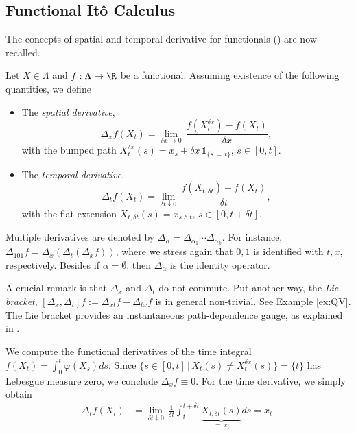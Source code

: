 \subsection{Functional Itô Calculus}
  The concepts of spatial and temporal derivative for functionals (\citet{Dupire}) are now recalled. 

\begin{definition}
Let $X \in \Lambda$ and $f:\Lambda \to \R$ be a functional. Assuming existence of the following quantities, we define
\begin{itemize}
    \item The \textit{spatial derivative},
    $$\Delta_x f(X_t) = \lim_{\delta x\to 0} \, \frac{f(X^{\delta x}_t)-f(X_t)}{\delta x}, $$
    with the bumped path $X^{\delta x}_t(s) =  x_s + \delta x\,\mathds{1}_{\{s\,=\,t\}}$, $s\in [0,t]$.
     \item The \textit{temporal derivative},
    $$\Delta_t f(X_t) = \lim_{\delta t\downarrow 0} \, \frac{f(X_{t,\delta t})-f(X_t)}{\delta t},$$
    with the flat extension $X_{t,\delta t}(s) = x_{s \wedge t}$, $s\in [0,t+\delta t ]$. %
\end{itemize}
\end{definition}
Multiple derivatives are denoted by  $\Delta_{\alpha} = \Delta_{\alpha_1} \cdots \Delta_{\alpha_k}$. For instance, 
$\Delta_{101}f = \Delta_{x} (\Delta_t(\Delta_x f))$, where we stress again that  $0,1$ is identified with $t,x$, respectively. Besides if $\alpha = \emptyset$, then $\Delta_{\alpha}$ is the identity operator.

A crucial remark is that $\Delta_x$ and $\Delta_t$ do not commute. Put another way, the \textit{Lie bracket},
$[\Delta_x,\Delta_t]f := \Delta_{xt}f- \Delta_{tx}f$ is in general non-trivial. See Example \ref{ex:QV}. The Lie bracket provides an instantaneous path-dependence gauge, as explained in  \cite{Jazaerli}. 

\begin{example}\label{ex:IntDev}
We compute the functional derivatives of the time integral $f(X_t) = \int_0^t \varphi(X_s) ds$.
Since $\{ s\in [0,t] \, | \, X_t(s) \ne X^{\delta x}_t(s)\} = \{ t \}$ has Lebesgue measure zero, we conclude $\Delta_xf \equiv 0$. For the time derivative, we simply obtain  
    \begin{align*}
        \Delta_t f(X_t) &= \lim_{\delta t\downarrow 0} \,  \frac{1}{\delta t}\int_t^{t+\delta t} \underbrace{X_{t,\delta t}(s)}_{= \, x_t}  ds = x_t.
    \end{align*}
\end{example}

